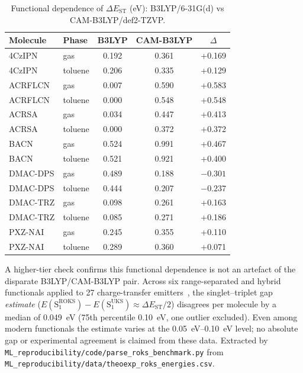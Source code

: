 \documentclass[twoside,twocolumn,9pt]{extarticle}
\begin{document}
\begin{table}[htbp]
  \centering
  \caption{Functional dependence of $\Delta E_\text{ST}$ (eV): B3LYP/6-31G(d)
    vs CAM-B3LYP/def2-TZVP.}
  \label{tab:dft_benchmark}
  \small
  \begin{tabular}{llccc}
    \toprule
    Molecule & Phase & B3LYP & CAM-B3LYP & $\Delta$ \\
    \midrule
    4CzIPN & gas & 0.192 & 0.361 & +0.169 \\
    4CzIPN & toluene & 0.206 & 0.335 & +0.129 \\
    ACRFLCN & gas & 0.007 & 0.590 & +0.583 \\
    ACRFLCN & toluene & 0.000 & 0.548 & +0.548 \\
    ACRSA & gas & 0.034 & 0.447 & +0.413 \\
    ACRSA & toluene & 0.000 & 0.372 & +0.372 \\
    BACN & gas & 0.524 & 0.991 & +0.467 \\
    BACN & toluene & 0.521 & 0.921 & +0.400 \\
    DMAC-DPS & gas & 0.489 & 0.188 & $-0.301$ \\
    DMAC-DPS & toluene & 0.444 & 0.207 & $-0.237$ \\
    DMAC-TRZ & gas & 0.098 & 0.261 & +0.163 \\
    DMAC-TRZ & toluene & 0.085 & 0.271 & +0.186 \\
    PXZ-NAI & gas & 0.245 & 0.355 & +0.110 \\
    PXZ-NAI & toluene & 0.289 & 0.360 & +0.071 \\
    \bottomrule
  \end{tabular}
\end{table}

A higher-tier check confirms this functional dependence is not an artefact of the
disparate B3LYP/CAM-B3LYP pair. Across six range-separated and hybrid functionals
applied to \num{27} charge-transfer emitters~\cite{Froitzheim2024}, the singlet--triplet gap \emph{estimate}
($E(\text{S}_1^\text{ROKS})-E(\text{S}_1^\text{UKS})\approx\Delta E_\text{ST}/2$)
disagrees per molecule by a median of \qty{0.049}{\electronvolt} (\num{75}th percentile
\qty{0.10}{\electronvolt}, one outlier excluded). Even among modern functionals the
estimate varies at the \qtyrange{0.05}{0.10}{\electronvolt} level; no absolute gap or
experimental agreement is claimed from these data. Extracted by
\texttt{ML\_reproducibility/code/parse\_roks\_benchmark.py} from \texttt{ML\_reproducibility/data/theoexp\_roks\_energies.csv}.
\end{document}
